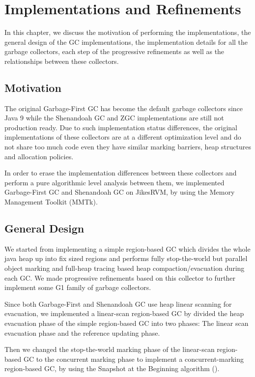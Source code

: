 \chapter{Implementations and Refinements}
\label{cha:methodology}

In this chapter, we discuss the motivation of performing the implementations,
the general design of the GC implementations,
the implementation details for all the garbage collectors,
each step of the progressive refinements as well as the relationships between these collectors.

\section{Motivation}

The original Garbage-First GC has become the default garbage collectors since Java 9
while the Shenandoah GC and ZGC implementations are still not production
ready. Due to such implementation status differences, the original implementations
of these collectors are at a different optimization level and do not share too
much code even they have similar marking barriers, heap structures and allocation policies.

In order to erase the implementation differences between these collectors and perform
a pure algorithmic level analysis between them, we implemented Garbage-First GC and
Shenandoah GC on JikesRVM, by using the Memory Management Toolkit (MMTk).

\section{General Design}

We started from implementing a simple region-based GC which divides the whole java heap
up into fix sized regions and performs fully stop-the-world but parallel object marking
and full-heap tracing based heap compaction/evacuation during each GC.
We made progressive refinements based on this collector to further implement some G1 family of garbage collectors.

Since both Garbage-First and Shenandoah GC use heap linear scanning for evacuation,
we implemented a linear-scan region-based GC by divided the heap evacuation phase
of the simple region-based GC into two phases: The linear scan evacuation phase
and the reference updating phase.

Then we changed the stop-the-world marking phase of the linear-scan region-based GC
to the concurrent marking phase to implement a concurrent-marking region-based GC, 
by using the Snapshot at the Beginning algorithm (\cite{yuasa1990real}).

